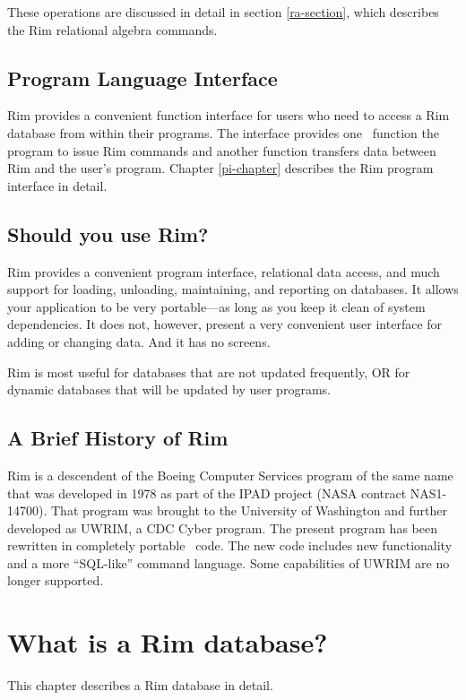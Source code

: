 \documentclass[11pt,a4paper]{report}
\begin{document}
These operations are discussed in detail in section
\ref{ra-section}, which describes the Rim relational
algebra commands.
 
 
\section{Program Language Interface}
Rim provides a convenient function interface
for users who need to access a Rim database from
within their programs.  The interface provides one \FortranF\ function
the program to issue Rim commands and another
function transfers data between Rim and the user's program.
Chapter \ref{pi-chapter} describes the Rim program interface
in detail.
 
\section{Should you use Rim?}
Rim provides a convenient program interface,
relational data access,
and much support for loading, unloading,
maintaining, and reporting on databases.  
It allows your application to be very
portable---as long as you keep it clean of system dependencies.
It does not, however, present
a very convenient user interface for adding or changing data.
And it has no screens.  

Rim is most useful for databases that are not updated frequently,
OR for dynamic databases that will be updated by user programs.

\section{A Brief History of Rim}
Rim is a descendent of the Boeing Computer Services program
of the same name that was developed in 1978 as part of the IPAD project
(NASA contract NAS1-14700).
That program was brought
to the University of Washington and further developed
as UWRIM, a CDC Cyber program.
The present program has been rewritten in completely portable
\FortranF\ code.  The new code includes new functionality
and a more ``SQL-like'' command language.
Some capabilities of UWRIM are no longer supported.
 
%
%
\chapter{What is a Rim database?}
 
 
This chapter describes a Rim database in detail.
 
\end{document}
